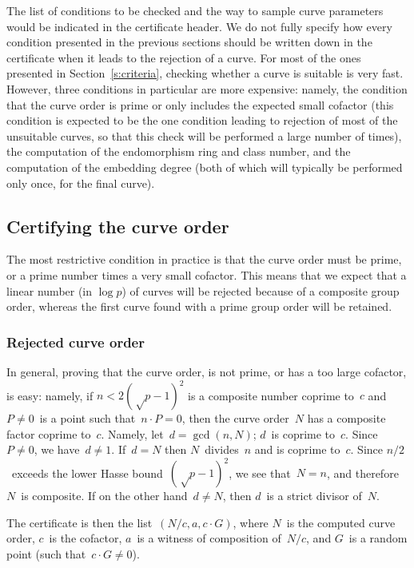 \documentclass[twocolumn,letterpaper,10pt]{article}
\begin{document}
The list of conditions to be checked and the way to sample
curve parameters would be indicated in the certificate header.
We do not fully specify how every condition presented
in the previous sections should be written down in the
certificate when it leads to the rejection of a curve.
For most of the ones presented in Section~\ref{s:criteria},
checking whether a curve is suitable is very fast.
However, three conditions in particular are more expensive:
namely, the condition that the curve order is prime or
only includes the expected small cofactor
(this condition is expected to be the one condition
leading to rejection of most of the unsuitable curves,
so that this check will be performed a large number of times),
the computation of the endomorphism ring and class number,
and the computation of the embedding degree
(both of which will typically be performed only once, for the final curve).

\subsection{Certifying the curve order}

The most restrictive condition in practice is that
the curve order must be prime, or a prime number
times a very small cofactor.
This means that we expect that a linear number (in $\log p$)
of curves will be rejected because of a composite group order,
whereas the first curve found with a prime group order
will be retained.

\subsubsection{Rejected curve order}

In general, proving that the curve order,
is not prime, or has a too large cofactor, is easy:
namely, if $n < 2 (√p-1)^2$ is a composite number coprime to~$c$
and $P ≠ 0$~is a point such that~$n · P = 0$,
then the curve order~$N$ has a composite factor coprime to~$c$.
Namely, let~$d = \gcd (n, N)$; $d$~is coprime to~$c$.
Since~$P≠0$, we have~$d≠1$.
If~$d = N$ then $N$~divides~$n$ and is coprime to~$c$.
Since $n/2$~exceeds the lower Hasse bound~$(√p-1)^2$,
we see that~$N = n$, and therefore $N$~is composite.
If on the other hand~$d ≠ N$, then $d$~is a strict divisor of~$N$.

The certificate is then the list~$(N/c, a, c · G)$,
where $N$~is the computed curve order, $c$~is the cofactor,
$a$~is a witness of composition of~$N/c$,
and $G$~is a random point (such that~$c · G ≠ 0$).
\end{document}

